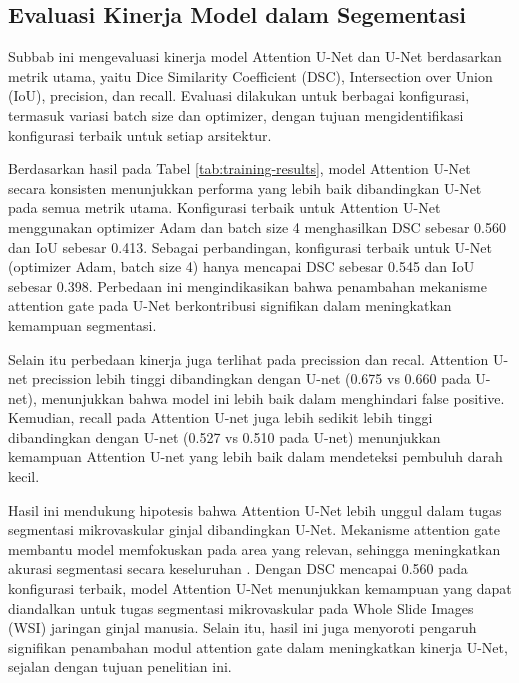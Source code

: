 \subsection{Evaluasi Kinerja Model dalam Segementasi}

\noindent Subbab ini mengevaluasi kinerja model Attention U-Net dan U-Net berdasarkan metrik utama, yaitu Dice Similarity Coefficient (DSC), Intersection over Union (IoU), precision, dan recall. Evaluasi dilakukan untuk berbagai konfigurasi, termasuk variasi batch size dan optimizer, dengan tujuan mengidentifikasi konfigurasi terbaik untuk setiap arsitektur. 

\noindent Berdasarkan hasil pada Tabel \ref{tab:training-results}, model Attention U-Net secara konsisten menunjukkan performa yang lebih baik dibandingkan U-Net pada semua metrik utama. Konfigurasi terbaik untuk Attention U-Net menggunakan optimizer Adam dan batch size 4 menghasilkan DSC sebesar 0.560 dan IoU sebesar 0.413. Sebagai perbandingan, konfigurasi terbaik untuk U-Net (optimizer Adam, batch size 4) hanya mencapai DSC sebesar 0.545 dan IoU sebesar 0.398. Perbedaan ini mengindikasikan bahwa penambahan mekanisme attention gate pada U-Net berkontribusi signifikan dalam meningkatkan kemampuan segmentasi.

\noindent Selain itu perbedaan kinerja juga terlihat pada precission dan recal. Attention U-net precission lebih tinggi dibandingkan dengan U-net (0.675 vs 0.660 pada U-net), menunjukkan bahwa model ini lebih baik dalam menghindari false positive. Kemudian, recall pada Attention U-net juga lebih sedikit lebih tinggi dibandingkan dengan U-net (0.527 vs 0.510 pada U-net) menunjukkan kemampuan Attention U-net yang lebih baik dalam mendeteksi pembuluh darah kecil.

\noindent Hasil ini mendukung hipotesis bahwa Attention U-Net lebih unggul dalam tugas segmentasi mikrovaskular ginjal dibandingkan U-Net. Mekanisme attention gate membantu model memfokuskan pada area yang relevan, sehingga meningkatkan akurasi segmentasi secara keseluruhan \cite{oktay_attention_2018}. Dengan DSC mencapai 0.560 pada konfigurasi terbaik, model Attention U-Net menunjukkan kemampuan yang dapat diandalkan untuk tugas segmentasi mikrovaskular pada Whole Slide Images (WSI) jaringan ginjal manusia. Selain itu, hasil ini juga menyoroti pengaruh signifikan penambahan modul attention gate dalam meningkatkan kinerja U-Net, sejalan dengan tujuan penelitian ini.



